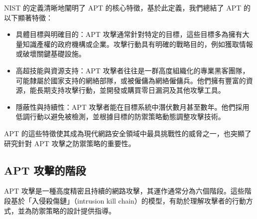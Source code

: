 \documentclass[a4paper,12pt]{article}
\begin{document}
NIST 的定義清晰地闡明了 APT 的核心特徵，基於此定義，我們總結了 APT 的以下顯著特徵：

\begin{itemize}
    \item 具體目標與明確目的：APT 攻擊通常針對特定的目標，這些目標多為擁有大量知識產權的政府機構或企業。攻擊行動具有明確的戰略目的，例如獲取情報或破壞關鍵基礎設施。
    \item 高超技能與資源支持：APT 攻擊者往往是一群高度組織化的專業黑客團隊，可能隸屬於國家支持的網絡部隊，或被僱傭為網絡僱傭兵。他們擁有豐富的資源，能長期支持攻擊行動，並開發或購買零日漏洞及其他攻擊工具。
    \item 隱蔽性與持續性：APT 攻擊者能在目標系統中潛伏數月甚至數年。他們採用低調行動以避免被檢測，並根據目標的防禦策略動態調整攻擊技術。
\end{itemize}

APT 的這些特徵使其成為現代網路安全領域中最具挑戰性的威脅之一，也突顯了研究針對 APT 攻擊之防禦策略的重要性。

\subsection{APT 攻擊的階段}

APT 攻擊是一種高度精密且持續的網路攻擊，其運作通常分為六個階段。這些階段基於「入侵殺傷鏈」（intrusion kill chain）的模型，有助於理解攻擊者的行動方式，並為防禦策略的設計提供指導。
\end{document}
